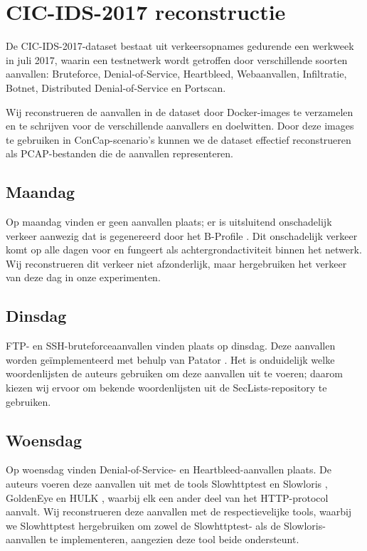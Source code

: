 \documentclass[conference]{IEEEtran}
\begin{document}
	\section{CIC-IDS-2017 reconstructie}\label{dataset_reconstruction}
	De CIC-IDS-2017-dataset bestaat uit verkeersopnames gedurende een werkweek in juli 2017, waarin een testnetwerk wordt getroffen door verschillende soorten aanvallen: Bruteforce, Denial-of-Service, Heartbleed, Webaanvallen, Infiltratie, Botnet, Distributed Denial-of-Service en Portscan.
	
	Wij reconstrueren de aanvallen in de dataset door Docker-images te verzamelen en te schrijven voor de verschillende aanvallers en doelwitten. Door deze images te gebruiken in ConCap-scenario’s kunnen we de dataset effectief reconstrueren als PCAP-bestanden die de aanvallen representeren.
	
	\subsection{Maandag}
	Op maandag vinden er geen aanvallen plaats; er is uitsluitend onschadelijk verkeer aanwezig dat is gegenereerd door het B-Profile \cite{b_profile}. Dit onschadelijk verkeer komt op alle dagen voor en fungeert als achtergrondactiviteit binnen het netwerk. Wij reconstrueren dit verkeer niet afzonderlijk, maar hergebruiken het verkeer van deze dag in onze experimenten.
	
	\subsection{Dinsdag}
	FTP- en SSH-bruteforceaanvallen vinden plaats op dinsdag. Deze aanvallen worden geïmplementeerd met behulp van Patator \cite{patator}. Het is onduidelijk welke woordenlijsten de auteurs gebruiken om deze aanvallen uit te voeren; daarom kiezen wij ervoor om bekende woordenlijsten uit de SecLists-repository \cite{seclists} te gebruiken.
	
	\subsection{Woensdag}
	Op woensdag vinden Denial-of-Service- en Heartbleed-aanvallen plaats. De auteurs voeren deze aanvallen uit met de tools Slowhttptest en Slowloris \cite{slowhttptest}, GoldenEye \cite{goldeneye} en HULK \cite{hulk}, waarbij elk een ander deel van het HTTP-protocol aanvalt. Wij reconstrueren deze aanvallen met de respectievelijke tools, waarbij we Slowhttptest hergebruiken om zowel de Slowhttptest- als de Slowloris-aanvallen te implementeren, aangezien deze tool beide ondersteunt.
	
\end{document}
